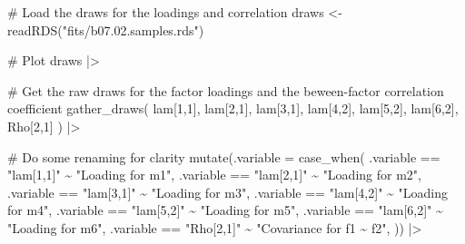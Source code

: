 \documentclass[
  letterpaper,
  DIV=11,
  numbers=noendperiod]{scrreprt}
\newenvironment{Shaded}{\begin{snugshade}}{\end{snugshade}}
\newcommand{\AttributeTok}[1]{\textcolor[rgb]{0.40,0.45,0.13}{#1}}
\newcommand{\CommentTok}[1]{\textcolor[rgb]{0.37,0.37,0.37}{#1}}
\newcommand{\FunctionTok}[1]{\textcolor[rgb]{0.28,0.35,0.67}{#1}}
\newcommand{\NormalTok}[1]{\textcolor[rgb]{0.00,0.23,0.31}{#1}}
\newcommand{\OtherTok}[1]{\textcolor[rgb]{0.00,0.23,0.31}{#1}}
\newcommand{\SpecialCharTok}[1]{\textcolor[rgb]{0.37,0.37,0.37}{#1}}
\newcommand{\StringTok}[1]{\textcolor[rgb]{0.13,0.47,0.30}{#1}}
\begin{document}
\begin{Shaded}
\begin{Highlighting}[]
\CommentTok{\# Load the draws for the loadings and correlation }
\NormalTok{draws }\OtherTok{\textless{}{-}} \FunctionTok{readRDS}\NormalTok{(}\StringTok{"fits/b07.02.samples.rds"}\NormalTok{)}

\CommentTok{\# Plot}
\NormalTok{draws }\SpecialCharTok{|\textgreater{}}

  \CommentTok{\# Get the raw draws for the factor loadings and the beween{-}factor correlation coefficient}
  \FunctionTok{gather\_draws}\NormalTok{(}
    \StringTok{\textasciigrave{}}\AttributeTok{lam[1,1]}\StringTok{\textasciigrave{}}\NormalTok{,}
    \StringTok{\textasciigrave{}}\AttributeTok{lam[2,1]}\StringTok{\textasciigrave{}}\NormalTok{,}
    \StringTok{\textasciigrave{}}\AttributeTok{lam[3,1]}\StringTok{\textasciigrave{}}\NormalTok{,}
    \StringTok{\textasciigrave{}}\AttributeTok{lam[4,2]}\StringTok{\textasciigrave{}}\NormalTok{,}
    \StringTok{\textasciigrave{}}\AttributeTok{lam[5,2]}\StringTok{\textasciigrave{}}\NormalTok{,}
    \StringTok{\textasciigrave{}}\AttributeTok{lam[6,2]}\StringTok{\textasciigrave{}}\NormalTok{,}
    \StringTok{\textasciigrave{}}\AttributeTok{Rho[2,1]}\StringTok{\textasciigrave{}}
\NormalTok{  ) }\SpecialCharTok{|\textgreater{}}

  \CommentTok{\# Do some renaming for clarity}
  \FunctionTok{mutate}\NormalTok{(}\AttributeTok{.variable =} \FunctionTok{case\_when}\NormalTok{(}
\NormalTok{    .variable }\SpecialCharTok{==} \StringTok{"lam[1,1]"} \SpecialCharTok{\textasciitilde{}} \StringTok{"Loading for m1"}\NormalTok{,}
\NormalTok{    .variable }\SpecialCharTok{==} \StringTok{"lam[2,1]"} \SpecialCharTok{\textasciitilde{}} \StringTok{"Loading for m2"}\NormalTok{,}
\NormalTok{    .variable }\SpecialCharTok{==} \StringTok{"lam[3,1]"} \SpecialCharTok{\textasciitilde{}} \StringTok{"Loading for m3"}\NormalTok{,}
\NormalTok{    .variable }\SpecialCharTok{==} \StringTok{"lam[4,2]"} \SpecialCharTok{\textasciitilde{}} \StringTok{"Loading for m4"}\NormalTok{,}
\NormalTok{    .variable }\SpecialCharTok{==} \StringTok{"lam[5,2]"} \SpecialCharTok{\textasciitilde{}} \StringTok{"Loading for m5"}\NormalTok{,}
\NormalTok{    .variable }\SpecialCharTok{==} \StringTok{"lam[6,2]"} \SpecialCharTok{\textasciitilde{}} \StringTok{"Loading for m6"}\NormalTok{,}
\NormalTok{    .variable }\SpecialCharTok{==} \StringTok{"Rho[2,1]"} \SpecialCharTok{\textasciitilde{}} \StringTok{"Covariance for f1 \textasciitilde{} f2"}\NormalTok{,}
\NormalTok{  )) }\SpecialCharTok{|\textgreater{}}


\end{Highlighting}
\end{Shaded}
\end{document}
